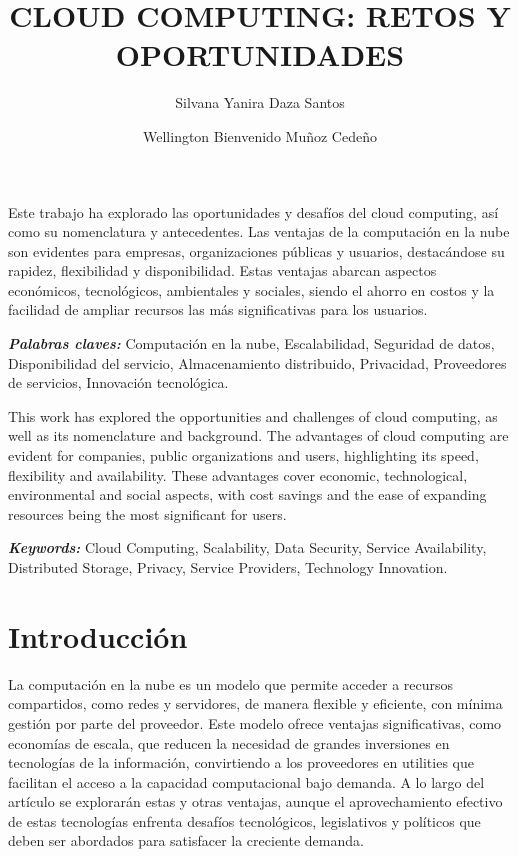 \documentclass[a4paper,10pt]{article}
\title{CLOUD COMPUTING: RETOS Y OPORTUNIDADES}
\author[1,*]{Silvana Yanira Daza Santos}
\author[2]{Wellington Bienvenido Muñoz Cedeño}
\affil[1]{Universidad Laica "Eloy Alfaro" de Manabí, El Carmen, Ecuador}
\date{}
\renewenvironment{abstract}
 {\small
  \begin{center}
  \bfseries \abstractname\vspace{-.5em}\vspace{0pt}
  \end{center}
  \list{}{%
    \setlength{\leftmargin}{4mm}%
    \setlength{\rightmargin}{\leftmargin}%
  }%
  \item\relax}
 {\endlist}
\providecommand{\keywords}[2]
{
  \hfill \break
  \small	
  \textbf{\textit{#1:}} #2
}
\begin{document}
\maketitle
\thispagestyle{firstpage}

\begin{abstract}
Este trabajo ha explorado las oportunidades y desafíos del cloud computing, así como su nomenclatura y antecedentes. Las ventajas de la computación en la nube son evidentes para empresas, organizaciones públicas y usuarios, destacándose su rapidez, flexibilidad y disponibilidad. Estas ventajas abarcan aspectos económicos, tecnológicos, ambientales y sociales, siendo el ahorro en costos y la facilidad de ampliar recursos las más significativas para los usuarios.     

\keywords{Palabras claves}{Computación en la nube, Escalabilidad, Seguridad de datos, Disponibilidad del servicio, Almacenamiento distribuido, Privacidad, Proveedores de servicios, Innovación tecnológica. }
\end{abstract}

\begin{abstract}
This work has explored the opportunities and challenges of cloud computing, as well as its nomenclature and background. The advantages of cloud computing are evident for companies, public organizations and users, highlighting its speed, flexibility and availability. These advantages cover economic, technological, environmental and social aspects, with cost savings and the ease of expanding resources being the most significant for users.  

\keywords{Keywords}{Cloud Computing, Scalability, Data Security, Service Availability, Distributed Storage, Privacy, Service Providers, Technology Innovation.}
\end{abstract} 

\section{Introducción}
La computación en la nube es un modelo que permite acceder a recursos compartidos, como redes y servidores, de manera flexible y eficiente, con mínima gestión por parte del proveedor. Este modelo ofrece ventajas significativas, como economías de escala, que reducen la necesidad de grandes inversiones en tecnologías de la información, convirtiendo a los proveedores en utilities que facilitan el acceso a la capacidad computacional bajo demanda. A lo largo del artículo se explorarán estas y otras ventajas, aunque el aprovechamiento efectivo de estas tecnologías enfrenta desafíos tecnológicos, legislativos y políticos que deben ser abordados para satisfacer la creciente demanda.
\end{document}
